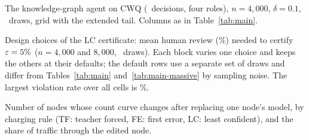 \begin{table}[!htb]
\centering\footnotesize
\setlength{\tabcolsep}{3.5pt}

\caption{The knowledge-graph agent on CWQ (\AgentNodesQ\ decisions, four roles),
$n=4{,}000$, $\delta=0.1$, \AgentTrials\ draws, grid with the extended tail. Columns as in
Table~\ref{tab:main}.}\label{tab:agent-cwq}
\end{table}

\begin{table}[!htb]
\centering\small

\caption{Design choices of the LC certificate: mean human review (\%) needed to certify
$\eps=5\%$ ($n=4{,}000$ and $8{,}000$, \AblationTrials\ draws). Each block varies one choice
and keeps the others at their defaults; the default rows use a separate set of draws and
differ from Tables~\ref{tab:main} and~\ref{tab:main-massive} by sampling noise. The largest
violation rate over all cells is \AblationMaxViol\%.}\label{tab:ablation}
\end{table}

\begin{table}[!htb]
\centering\small

\caption{Number of nodes whose count curve changes after replacing one node's model, by
charging rule (TF: teacher forced, FE: first error, LC: least confident), and the share of
traffic through the edited node.}\label{tab:footprints}
\end{table}
